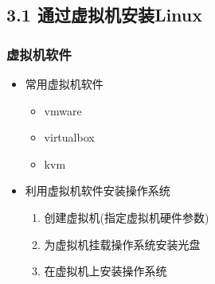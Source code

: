 \documentclass[xcolor=svgnames,presentation]{beamer}
\begin{document}
\subsection{3.1 通过虚拟机安装Linux}
\label{sec-3-1}
\begin{frame}
\frametitle{虚拟机软件}
\label{sec-3-1-1}
\begin{itemize}

\item 常用虚拟机软件
\label{sec-3-1-1-1}%
\begin{itemize}

\item vmware
\label{sec-3-1-1-1-1}%

\item virtualbox
\label{sec-3-1-1-1-2}%

\item kvm
\label{sec-3-1-1-1-3}%
\end{itemize} %

\item 利用虚拟机软件安装操作系统
\label{sec-3-1-1-2}%
\begin{enumerate}
\item 创建虚拟机(指定虚拟机硬件参数)
\item 为虚拟机挂载操作系统安装光盘
\item 在虚拟机上安装操作系统
\end{enumerate}
\end{itemize} %
\end{frame}
\end{document}
